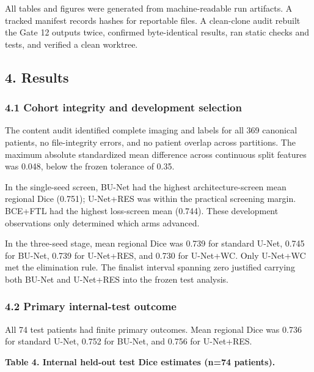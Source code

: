\documentclass[
  10pt,
  letterpaper,
]{article}
\begin{document}
All tables and figures were generated from machine-readable run
artifacts. A tracked manifest records hashes for reportable files. A
clean-clone audit rebuilt the Gate 12 outputs twice, confirmed
byte-identical results, ran static checks and tests, and verified a
clean worktree.

\subsection{4. Results}\label{results}

\subsubsection{4.1 Cohort integrity and development
selection}\label{cohort-integrity-and-development-selection}

The content audit identified complete imaging and labels for all 369
canonical patients, no file-integrity errors, and no patient overlap
across partitions. The maximum absolute standardized mean difference
across continuous split features was 0.048, below the frozen tolerance
of 0.35.

In the single-seed screen, BU-Net had the highest architecture-screen
mean regional Dice (0.751); U-Net+RES was within the practical screening
margin. BCE+FTL had the highest loss-screen mean (0.744). These
development observations only determined which arms advanced.

In the three-seed stage, mean regional Dice was 0.739 for standard
U-Net, 0.745 for BU-Net, 0.739 for U-Net+RES, and 0.730 for U-Net+WC.
Only U-Net+WC met the elimination rule. The finalist interval spanning
zero justified carrying both BU-Net and U-Net+RES into the frozen test
analysis.

\subsubsection{4.2 Primary internal-test
outcome}\label{primary-internal-test-outcome}

All 74 test patients had finite primary outcomes. Mean regional Dice was
0.736 for standard U-Net, 0.752 for BU-Net, and 0.756 for U-Net+RES.

\textbf{Table 4. Internal held-out test Dice estimates (n=74 patients).}
\end{document}
